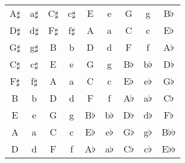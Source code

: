 \begin{tabular}{ccccccccc}
  A$\sharp$ & a$\sharp$ & C$\sharp$ & c$\sharp$ & E  & e  & G  & g  & B$\flat$\\
  D$\sharp$ & d$\sharp$ & F$\sharp$ & f$\sharp$ & A  & a  & C  & c  & E$\flat$\\
  G$\sharp$ & g$\sharp$ & B  & b  & D  & d  & F  & f  & A$\flat$\\
  C$\sharp$ & c$\sharp$ & E  & e  & G  & g  & B$\flat$ & b$\flat$ & D$\flat$\\
  F$\sharp$ & f$\sharp$ & A  & a  & C  & c  & E$\flat$ & e$\flat$ & G$\flat$\\
  B  & b  & D  & d  & F  & f  & A$\flat$ & a$\flat$ & C$\flat$\\
  E  & e  & G  & g  & B$\flat$ & b$\flat$ & D$\flat$ & d$\flat$ & F$\flat$\\
  A  & a  & C  & c  & E$\flat$ & e$\flat$ & G$\flat$ & g$\flat$ & B$\flat$$\flat$\\
  D  & d  & F  & f  & A$\flat$ & a$\flat$ & C$\flat$ & c$\flat$ & E$\flat$$\flat$\\
\end{tabular}
